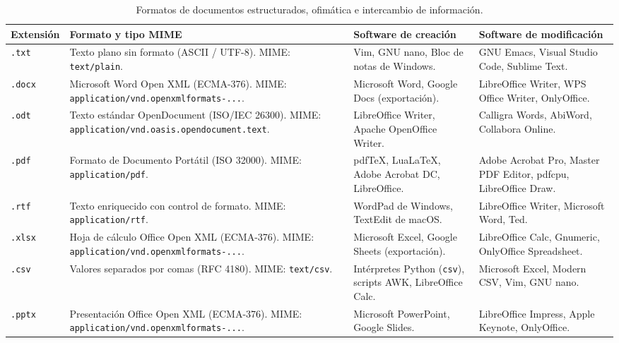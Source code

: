 \documentclass[12pt]{article}
\begin{document}
\begin{table}[H]
\centering
\scriptsize
\renewcommand{\arraystretch}{0.95}
\renewcommand{\tabularxcolumn}[1]{m{#1}}
\setlength{\emergencystretch}{2em}
\caption{Formatos de documentos estructurados, ofimática e intercambio de información.}
\label{tab:formatosOfimatica}
\begin{tabularx}{\textwidth}{>{\centering\arraybackslash}m{1.8cm} X X X}
\toprule
\textbf{Extensión} & \textbf{Formato y tipo MIME} & \textbf{Software de creación} & \textbf{Software de modificación} \\
\midrule
\texttt{.txt} & Texto plano sin formato (ASCII / UTF-8). MIME: \texttt{text/plain}. & Vim, GNU nano, Bloc de notas de Windows. & GNU Emacs, Visual Studio Code, Sublime Text. \\
\texttt{.docx} & Microsoft Word Open XML (ECMA-376). MIME: \texttt{application/\allowbreak vnd.openxmlformats-...}. & Microsoft Word, Google Docs (exportación). & LibreOffice Writer, WPS Office Writer, OnlyOffice. \\
\texttt{.odt} & Texto estándar OpenDocument (ISO/IEC 26300). MIME: \texttt{application/\allowbreak vnd.oasis.\allowbreak opendocument.text}. & LibreOffice Writer, Apache OpenOffice Writer. & Calligra Words, AbiWord, Collabora Online. \\
\texttt{.pdf} & Formato de Documento Portátil (ISO 32000). MIME: \texttt{application/pdf}. & pdfTeX, LuaLaTeX, Adobe Acrobat DC, LibreOffice. & Adobe Acrobat Pro, Master PDF Editor, pdfcpu, LibreOffice Draw. \\
\texttt{.rtf} & Texto enriquecido con control de formato. MIME: \texttt{application/rtf}. & WordPad de Windows, TextEdit de macOS. & LibreOffice Writer, Microsoft Word, Ted. \\
\texttt{.xlsx} & Hoja de cálculo Office Open XML (ECMA-376). MIME: \texttt{application/\allowbreak vnd.openxmlformats-...}. & Microsoft Excel, Google Sheets (exportación). & LibreOffice Calc, Gnumeric, OnlyOffice Spreadsheet. \\
\texttt{.csv} & Valores separados por comas (RFC 4180). MIME: \texttt{text/csv}. & Intérpretes Python (\texttt{csv}), scripts AWK, LibreOffice Calc. & Microsoft Excel, Modern CSV, Vim, GNU nano. \\
\texttt{.pptx} & Presentación Office Open XML (ECMA-376). MIME: \texttt{application/\allowbreak vnd.openxmlformats-...}. & Microsoft PowerPoint, Google Slides. & LibreOffice Impress, Apple Keynote, OnlyOffice. \\
\bottomrule
\end{tabularx}
\end{table}
\end{document}
